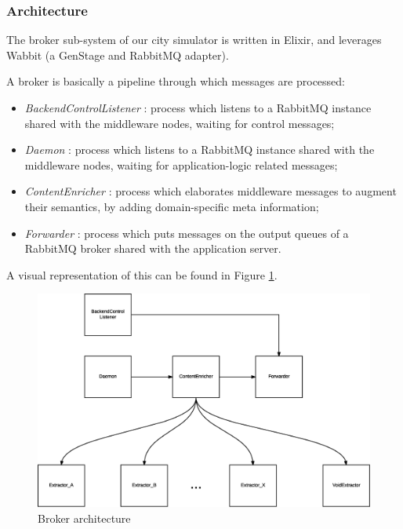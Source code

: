 \subsubsection{Architecture}

The broker sub-system of our city simulator is written in Elixir, and leverages
Wabbit (a GenStage and RabbitMQ adapter).

A broker is basically a pipeline through which messages are processed:

\begin{itemize}
  \item \textit{BackendControlListener} : process which listens to
    a RabbitMQ instance shared
    with the middleware nodes,
    waiting for control messages;
  \item \textit{Daemon} :
    process which listens to
    a RabbitMQ instance shared
    with the middleware nodes,
    waiting for application-logic related messages;
  \item \textit{ContentEnricher} :
    process which elaborates middleware
    messages to augment their semantics,
    by adding domain-specific meta information;
  \item \textit{Forwarder} :
    process which puts messages
    on the output queues of a
    RabbitMQ broker
    shared with the application server.
\end{itemize}

A visual representation of this can be found in Figure \ref{fig:broker-arch}.

\begin{figure}[H]
  \centering
  \includegraphics[width=.95\columnwidth]{images/implementation/broker.eps}
  \caption{Broker architecture}
  \label{fig:broker-arch}
\end{figure}

